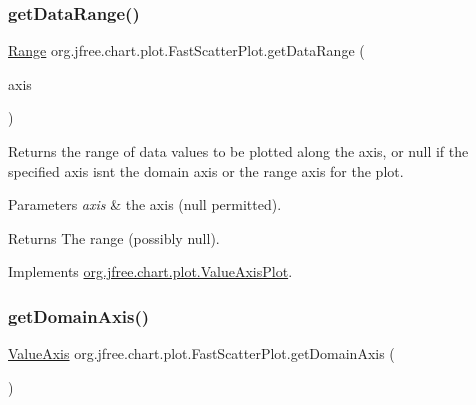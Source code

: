 \subsubsection{\texorpdfstring{get\+Data\+Range()}{getDataRange()}}
{\footnotesize\ttfamily \mbox{\hyperlink{classorg_1_1jfree_1_1data_1_1_range}{Range}} org.\+jfree.\+chart.\+plot.\+Fast\+Scatter\+Plot.\+get\+Data\+Range (\begin{DoxyParamCaption}\item[{\mbox{\hyperlink{classorg_1_1jfree_1_1chart_1_1axis_1_1_value_axis}{Value\+Axis}}}]{axis }\end{DoxyParamCaption})}

Returns the range of data values to be plotted along the axis, or {\ttfamily null} if the specified axis isn\textquotesingle{}t the domain axis or the range axis for the plot.


\begin{DoxyParams}{Parameters}
{\em axis} & the axis ({\ttfamily null} permitted).\\
\hline
\end{DoxyParams}
\begin{DoxyReturn}{Returns}
The range (possibly {\ttfamily null}). 
\end{DoxyReturn}


Implements \mbox{\hyperlink{interfaceorg_1_1jfree_1_1chart_1_1plot_1_1_value_axis_plot_a54815b2f078c11b2618804fe3e7e5353}{org.\+jfree.\+chart.\+plot.\+Value\+Axis\+Plot}}.

\mbox{\label{classorg_1_1jfree_1_1chart_1_1plot_1_1_fast_scatter_plot_adce6bd628c2b1bc6a2ed816cbd63f769}} 
\subsubsection{\texorpdfstring{get\+Domain\+Axis()}{getDomainAxis()}}
{\footnotesize\ttfamily \mbox{\hyperlink{classorg_1_1jfree_1_1chart_1_1axis_1_1_value_axis}{Value\+Axis}} org.\+jfree.\+chart.\+plot.\+Fast\+Scatter\+Plot.\+get\+Domain\+Axis (\begin{DoxyParamCaption}{ }\end{DoxyParamCaption})}

